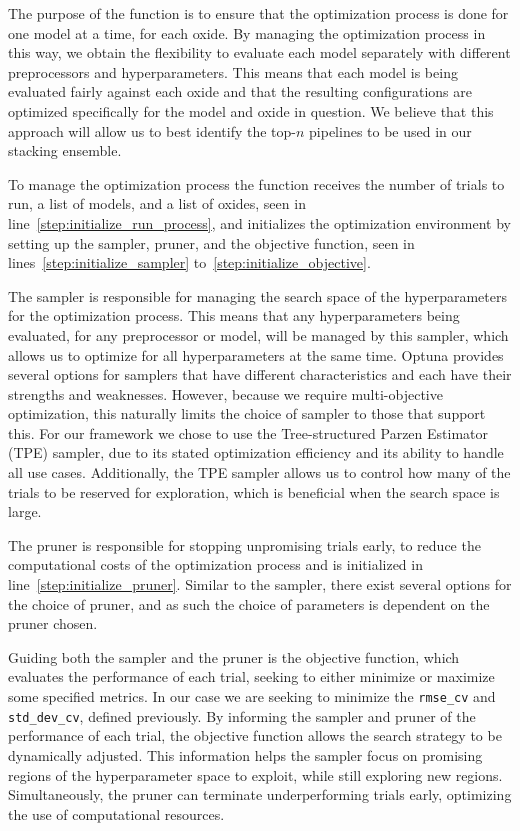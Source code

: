 The purpose of the  function is to ensure that the optimization process is done for one model at a time, for each oxide.
By managing the optimization process in this way, we obtain the flexibility to evaluate each model separately with different preprocessors and hyperparameters.
This means that each model is being evaluated fairly against each oxide and that the resulting configurations are optimized specifically for the model and oxide in question.
We believe that this approach will allow us to best identify the top-$n$ pipelines to be used in our stacking ensemble.

To manage the optimization process the function receives the number of trials to run, a list of models, and a list of oxides, seen in line~\ref{step:initialize_run_process}, and initializes the optimization environment by setting up the sampler, pruner, and the objective function, seen in lines~\ref{step:initialize_sampler} to~\ref{step:initialize_objective}.

The sampler is responsible for managing the search space of the hyperparameters for the optimization process.
This means that any hyperparameters being evaluated, for any preprocessor or model, will be managed by this sampler, which allows us to optimize for all hyperparameters at the same time.
Optuna provides several options for samplers that have different characteristics and each have their strengths and weaknesses.
However, because we require multi-objective optimization, this naturally limits the choice of sampler to those that support this.
For our framework we chose to use the Tree-structured Parzen Estimator (TPE) sampler, due to its stated optimization efficiency and its ability to handle all use cases. 
Additionally, the TPE sampler allows us to control how many of the trials to be reserved for exploration, which is beneficial when the search space is large. \cite{optuna_2019}

The pruner is responsible for stopping unpromising trials early, to reduce the computational costs of the optimization process and is initialized in line~\ref{step:initialize_pruner}.
Similar to the sampler, there exist several options for the choice of pruner, and as such the choice of parameters is dependent on the pruner chosen.

Guiding both the sampler and the pruner is the objective function, which evaluates the performance of each trial, seeking to either minimize or maximize some specified metrics.
In our case we are seeking to minimize the \texttt{rmse\_cv} and \texttt{std\_dev\_cv}, defined previously.
By informing the sampler and pruner of the performance of each trial, the objective function allows the search strategy to be dynamically adjusted. 
This information helps the sampler focus on promising regions of the hyperparameter space to exploit, while still exploring new regions. 
Simultaneously, the pruner can terminate underperforming trials early, optimizing the use of computational resources.


